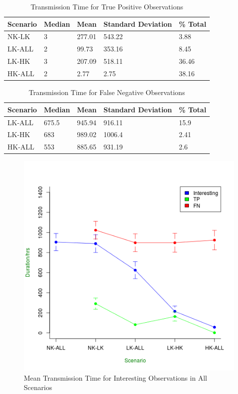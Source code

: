 \begin{table}[h]\footnotesize
\begin{tabularx}{\textwidth}{ |X|X|X|X|X|}
\hline
Scenario & Median & Mean & Standard Deviation & \% Total\\
\hline
NK-LK & 3 & 277.01 & 543.22 & 3.88\\
LK-ALL & 2 & 99.73 & 353.16 & 8.45\\
LK-HK & 3 & 207.09 & 518.11 & 36.46\\
HK-ALL & 2 & 2.77 & 2.75 & 38.16\\
\hline
\end{tabularx}
\caption{Transmission Time for True Positive Observations}\label{tab:observ_tp}
\end{table}

\begin{table}[h]\footnotesize
\begin{tabularx}{\textwidth}{ |X|X|X|X|X|}
\hline
Scenario & Median & Mean & Standard Deviation & \% Total\\
\hline
LK-ALL & 675.5 & 945.94 & 916.11 & 15.9\\ 
LK-HK & 683 & 989.02 & 1006.4 & 2.41\\
HK-ALL & 553 & 885.65 & 931.19 & 2.6\\
\hline
\end{tabularx}
\caption{Transmission Time for False Negative Observations}\label{tab:observ_fn}
\end{table}

\begin{figure}[!h]
\centering
\includegraphics[width=\textwidth]{Chap7/figures/all_int.png}
\caption{Mean Transmission Time for Interesting Observations in All Scenarios}
\label{fig:all_int}
\end{figure}

